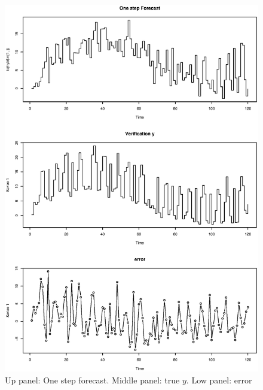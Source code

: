 \documentclass[11pt,a4paper]{article}
\begin{document}
\begin{figure} \includegraphics[width=12cm]{prediction.eps}
\caption{Up panel: One step forecast. Middle panel: true $y$. Low panel: error}
\end{figure}
\end{document}
